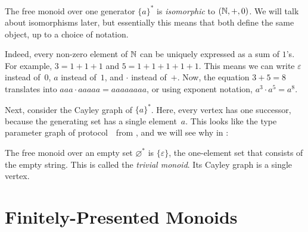 \documentclass[../generics]{subfiles}
\begin{document}
\begin{example}\label{monoid n graph}
The free monoid over one generator $\{a\}^*$ is \emph{isomorphic} to $(\mathbb{N},+,0)$. We will talk about isomorphisms later, but essentially this means that both define the same object, up to a choice of notation.

Indeed, every non-zero element of $\mathbb{N}$ can be uniquely expressed as a sum of $1$'s. For example, $3=1+1+1$ and $5=1+1+1+1+1$. This means we can write $\varepsilon$ instead of~$0$, $a$ instead of~$1$, and $\cdot$ instead of~$+$. Now, the equation $3+5=8$ translates into $aaa\cdot aaaaa=aaaaaaaa$, or using exponent notation, $a^3\cdot a^5 = a^8$.

Next, consider the Cayley graph of $\{a\}^*$. Here, every vertex has one successor, because the generating set has a single element~$a$. This looks like the type parameter graph of protocol~\tN\ from , and we will see why in :

\begin{center}
\end{center}
\end{example}

\begin{example}
The free monoid over an empty set $\varnothing^*$ is $\{\varepsilon\}$, the one-element set that consists of the empty string. This is called the \emph{trivial monoid}. Its Cayley graph is a single vertex.
\end{example}

\section{Finitely-Presented Monoids}\label{finitely presented monoids}
\end{document}
